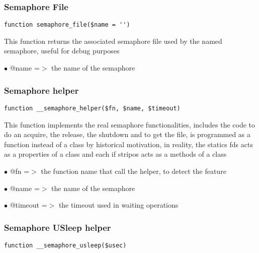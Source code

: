 \documentclass[a4paper]{article}
\begin{document}
\hypertarget{toc207}{}
\subsubsection{Semaphore File}

\begin{lstlisting}
function semaphore_file($name = '')
\end{lstlisting}

This function returns the associated semaphore file used by the
named semaphore, useful for debug purposes

\begin{compactitem}
\item[\color{myblue}$\bullet$] @name =$>$ the name of the semaphore
\end{compactitem}

\hypertarget{toc208}{}
\subsubsection{Semaphore helper}

\begin{lstlisting}
function __semaphore_helper($fn, $name, $timeout)
\end{lstlisting}

This function implements the real semaphore functionalities, includes
the code to do an acquire, the release, the shutdown and to get the
file, is programmed as a function instead of a class by historical
motivation, in reality, the statics fds acts as a properties of a
class and each if stripos acts as a methods of a class

\begin{compactitem}
\item[\color{myblue}$\bullet$] @fn      =$>$ the function name that call the helper, to detect the feature
\item[\color{myblue}$\bullet$] @name    =$>$ the name of the semaphore
\item[\color{myblue}$\bullet$] @timeout =$>$ the timeout used in waiting operations
\end{compactitem}

\hypertarget{toc209}{}
\subsubsection{Semaphore USleep helper}

\begin{lstlisting}
function __semaphore_usleep($usec)
\end{lstlisting}
\end{document}
